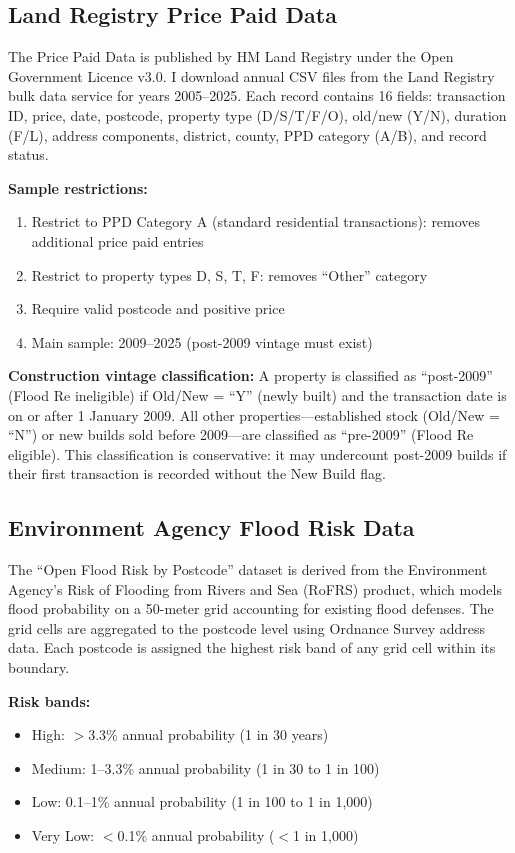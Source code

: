 \documentclass[12pt]{article}
\begin{document}
\subsection{Land Registry Price Paid Data}

The Price Paid Data is published by HM Land Registry under the Open Government Licence v3.0. I download annual CSV files from the Land Registry bulk data service for years 2005--2025. Each record contains 16 fields: transaction ID, price, date, postcode, property type (D/S/T/F/O), old/new (Y/N), duration (F/L), address components, district, county, PPD category (A/B), and record status.

\textbf{Sample restrictions:}
\begin{enumerate}
\item Restrict to PPD Category A (standard residential transactions): removes additional price paid entries
\item Restrict to property types D, S, T, F: removes ``Other'' category
\item Require valid postcode and positive price
\item Main sample: 2009--2025 (post-2009 vintage must exist)
\end{enumerate}

\textbf{Construction vintage classification:} A property is classified as ``post-2009'' (Flood Re ineligible) if Old/New = ``Y'' (newly built) and the transaction date is on or after 1 January 2009. All other properties---established stock (Old/New = ``N'') or new builds sold before 2009---are classified as ``pre-2009'' (Flood Re eligible). This classification is conservative: it may undercount post-2009 builds if their first transaction is recorded without the New Build flag.

\subsection{Environment Agency Flood Risk Data}

The ``Open Flood Risk by Postcode'' dataset is derived from the Environment Agency's Risk of Flooding from Rivers and Sea (RoFRS) product, which models flood probability on a 50-meter grid accounting for existing flood defenses. The grid cells are aggregated to the postcode level using Ordnance Survey address data. Each postcode is assigned the highest risk band of any grid cell within its boundary.

\textbf{Risk bands:}
\begin{itemize}
\item High: $>$3.3\% annual probability (1 in 30 years)
\item Medium: 1--3.3\% annual probability (1 in 30 to 1 in 100)
\item Low: 0.1--1\% annual probability (1 in 100 to 1 in 1,000)
\item Very Low: $<$0.1\% annual probability ($<$1 in 1,000)
\end{itemize}
\end{document}

